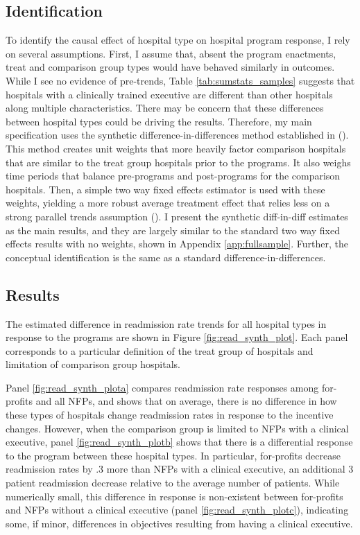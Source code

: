 \documentclass[12pt]{article}
\begin{document}
 \subsection{Identification}

 To identify the causal effect of hospital type on hospital program response, I rely on several assumptions. First, I assume that, absent the program enactments, treat and comparison group types would have behaved similarly in outcomes. While I see no evidence of pre-trends, Table \ref{tab:sumstats_samples} suggests that hospitals with a clinically trained executive are different than other hospitals along multiple characteristics. There may be concern that these differences between hospital types could be driving the results. Therefore, my main specification uses the synthetic difference-in-differences method established in \citeauthor{arkhangelsky2021synthetic} (\citeyear{arkhangelsky2021synthetic}). This method creates unit weights that more heavily factor comparison hospitals that are similar to the treat group hospitals prior to the programs. It also weighs time periods that balance pre-programs and post-programs for the comparison hospitals. Then, a simple two way fixed effects estimator is used with these weights, yielding a more robust average treatment effect that relies less on a strong parallel trends assumption (\cite{arkhangelsky2021synthetic}). I present the synthetic diff-in-diff estimates as the main results, and they are largely similar to the standard two way fixed effects results with no weights, shown in Appendix \ref{app:fullsample}. Further, the conceptual identification is the same as a standard difference-in-differences.

 \subsection{Results}

 The estimated difference in readmission rate trends for all hospital types in response to the programs are shown in Figure \ref{fig:read_synth_plot}. Each panel corresponds to a particular definition of the treat group of hospitals and limitation of comparison group hospitals.
     
     Panel \ref{fig:read_synth_plota} compares readmission rate responses among for-profits and all NFPs, and shows that on average, there is no difference in how these types of hospitals change readmission rates in response to the incentive changes. However, when the comparison group is limited to NFPs with a clinical executive, panel \ref{fig:read_synth_plotb} shows that there is a differential response to the program between these hospital types. In particular, for-profits decrease readmission rates by .3 more than NFPs with a clinical executive, an additional 3 patient readmission decrease relative to the average number of patients. While numerically small, this difference in response is non-existent between for-profits and NFPs without a clinical executive (panel \ref{fig:read_synth_plotc}), indicating some, if minor, differences in objectives resulting from having a clinical executive. 
\end{document}
